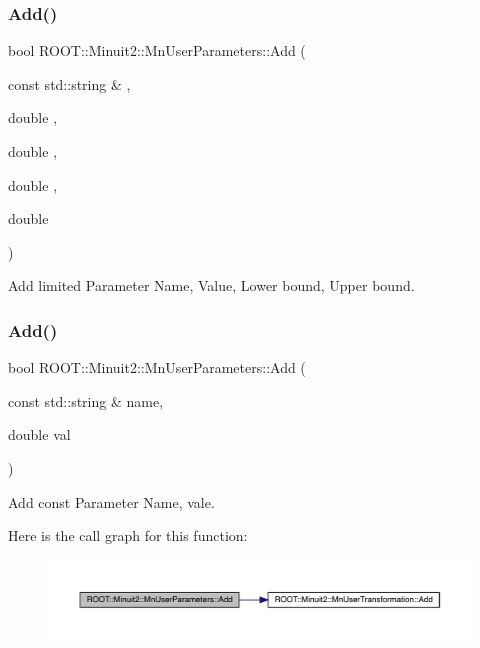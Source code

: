 \subsubsection{\texorpdfstring{Add()}{Add()}\hspace{0.1cm}{\footnotesize\ttfamily [4/6]}}
{\footnotesize\ttfamily bool R\+O\+O\+T\+::\+Minuit2\+::\+Mn\+User\+Parameters\+::\+Add (\begin{DoxyParamCaption}\item[{const std\+::string \&}]{,  }\item[{double}]{,  }\item[{double}]{,  }\item[{double}]{,  }\item[{double}]{ }\end{DoxyParamCaption})}



Add limited Parameter Name, Value, Lower bound, Upper bound. 

\mbox{\label{classROOT_1_1Minuit2_1_1MnUserParameters_acb750b2b34d2a7a233f559d6820bbb35}} 
\subsubsection{\texorpdfstring{Add()}{Add()}\hspace{0.1cm}{\footnotesize\ttfamily [5/6]}}
{\footnotesize\ttfamily bool R\+O\+O\+T\+::\+Minuit2\+::\+Mn\+User\+Parameters\+::\+Add (\begin{DoxyParamCaption}\item[{const std\+::string \&}]{name,  }\item[{double}]{val }\end{DoxyParamCaption})}



Add const Parameter Name, vale. 

Here is the call graph for this function\+:\nopagebreak
\begin{figure}[H]
\begin{center}
\leavevmode
\includegraphics[width=350pt]{d6/d10/classROOT_1_1Minuit2_1_1MnUserParameters_acb750b2b34d2a7a233f559d6820bbb35_cgraph}
\end{center}
\end{figure}
\mbox{\label{classROOT_1_1Minuit2_1_1MnUserParameters_acb750b2b34d2a7a233f559d6820bbb35}} 
